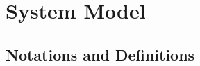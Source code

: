 

\section{System Model}\label{sec:model}
\subsection{Notations and Definitions}\label{sec:def}

 

